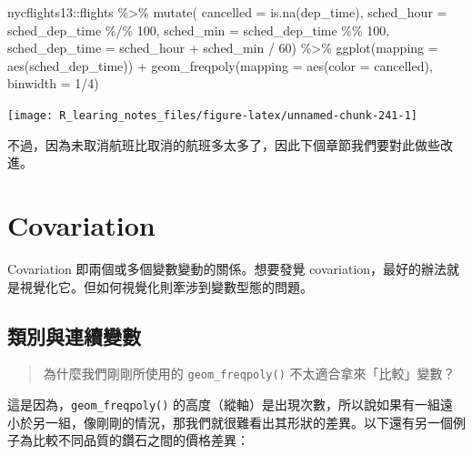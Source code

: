 \documentclass[
]{book}
\newenvironment{Shaded}{\begin{snugshade}}{\end{snugshade}}
\newcommand{\AttributeTok}[1]{\textcolor[rgb]{0.77,0.63,0.00}{#1}}
\newcommand{\DecValTok}[1]{\textcolor[rgb]{0.00,0.00,0.81}{#1}}
\newcommand{\FunctionTok}[1]{\textcolor[rgb]{0.00,0.00,0.00}{#1}}
\newcommand{\NormalTok}[1]{#1}
\newcommand{\SpecialCharTok}[1]{\textcolor[rgb]{0.00,0.00,0.00}{#1}}
\theoremstyle{definition}
\theoremstyle{remark}
\begin{document}
\begin{Shaded}
\begin{Highlighting}[]
\NormalTok{nycflights13}\SpecialCharTok{::}\NormalTok{flights }\SpecialCharTok{\%\textgreater{}\%}
  \FunctionTok{mutate}\NormalTok{(}
    \AttributeTok{cancelled =} \FunctionTok{is.na}\NormalTok{(dep\_time),}
    \AttributeTok{sched\_hour =}\NormalTok{ sched\_dep\_time }\SpecialCharTok{\%/\%} \DecValTok{100}\NormalTok{,}
    \AttributeTok{sched\_min =}\NormalTok{ sched\_dep\_time }\SpecialCharTok{\%\%} \DecValTok{100}\NormalTok{,}
    \AttributeTok{sched\_dep\_time =}\NormalTok{ sched\_hour }\SpecialCharTok{+}\NormalTok{ sched\_min }\SpecialCharTok{/} \DecValTok{60}\NormalTok{) }\SpecialCharTok{\%\textgreater{}\%}
  \FunctionTok{ggplot}\NormalTok{(}\AttributeTok{mapping =} \FunctionTok{aes}\NormalTok{(sched\_dep\_time)) }\SpecialCharTok{+}
  \FunctionTok{geom\_freqpoly}\NormalTok{(}\AttributeTok{mapping =} \FunctionTok{aes}\NormalTok{(}\AttributeTok{color =}\NormalTok{ cancelled), }\AttributeTok{binwidth =} \DecValTok{1}\SpecialCharTok{/}\DecValTok{4}\NormalTok{)}
\end{Highlighting}
\end{Shaded}

\begin{center}\texttt{[image: R\_learing\_notes\_files/figure-latex/unnamed-chunk-241-1]} \end{center}

不過，因為未取消航班比取消的航班多太多了，因此下個章節我們要對此做些改進。

\hypertarget{covariation}{%
\section{Covariation}\label{covariation}}

Covariation 即兩個或多個變數變動的關係。想要發覺 covariation，最好的辦法就是視覺化它。但如何視覺化則牽涉到變數型態的問題。

\hypertarget{ux985eux5225ux8207ux9023ux7e8cux8b8aux6578}{%
\subsection{類別與連續變數}\label{ux985eux5225ux8207ux9023ux7e8cux8b8aux6578}}

\begin{quote}
為什麼我們剛剛所使用的 \texttt{geom\_freqpoly()} 不太適合拿來「比較」變數？
\end{quote}

這是因為，\texttt{geom\_freqpoly()} 的高度（縱軸）是出現次數，所以說如果有一組遠小於另一組，像剛剛的情況，那我們就很難看出其形狀的差異。以下還有另一個例子為比較不同品質的鑽石之間的價格差異：
\end{document}
